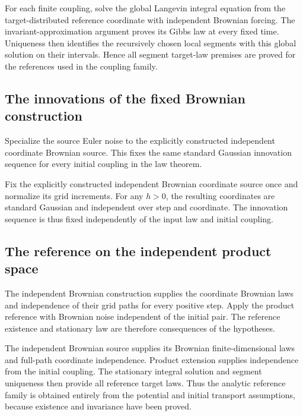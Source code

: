 \documentclass[11pt,a4paper]{article}
\begin{document}
For each finite coupling, solve the global Langevin integral equation from the target-distributed reference coordinate with independent Brownian forcing. The invariant-approximation argument proves its Gibbs law at every fixed time. Uniqueness then identifies the recursively chosen local segments with this global solution on their intervals. Hence all segment target-law premises are proved for the references used in the coupling family.


\subsection{\texorpdfstring{The innovations of the fixed Brownian construction}{The innovations of the fixed Brownian construction}}


Specialize the source Euler noise to the explicitly constructed independent coordinate Brownian source. This fixes the same standard Gaussian innovation sequence for every initial coupling in the law theorem.



Fix the explicitly constructed independent Brownian coordinate source once and normalize its grid increments. For any \(h>0\), the resulting coordinates are standard Gaussian and independent over step and coordinate. The innovation sequence is thus fixed independently of the input law and initial coupling.


\subsection{\texorpdfstring{The reference on the independent product space}{The reference on the independent product space}}


The independent Brownian construction supplies the coordinate Brownian laws and independence of their grid paths for every positive step. Apply the product reference with Brownian noise independent of the initial pair. The reference existence and stationary law are therefore consequences of the hypotheses.



The independent Brownian source supplies its Brownian finite-dimensional laws and full-path coordinate independence. Product extension supplies independence from the initial coupling. The stationary integral solution and segment uniqueness then provide all reference target laws. Thus the analytic reference family is obtained entirely from the potential and initial transport assumptions, because existence and invariance have been proved.
\end{document}
